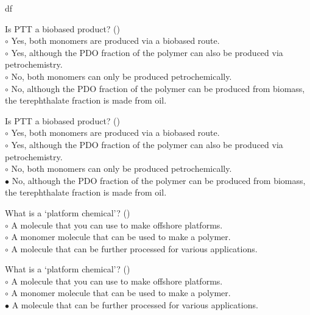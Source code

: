 df\documentclass[]{beamer}
\begin{document}
\begin{CJK}{UTF8}{gbsn}
\begin{frame}[shrink] {}
\addtocounter{questions}{1}
\color{blue}
Is PTT a biobased product?
({})\\
\color{black}
\setlength{\parindent}{-0.4cm}
{\color{red}$\circ$} Yes, both monomers are produced via a biobased route.  \\
{\color{red}$\circ$} Yes, although the PDO fraction of the polymer can also be produced via petrochemistry.   \\
{\color{red}$\circ$} No, both monomers can only be produced petrochemically.   \\
{\color{red}$\circ$}  No, although the PDO fraction of the polymer can be produced from biomass, the terephthalate fraction is made from oil.   \\
\end{frame}
\begin{frame}[shrink] {}
\addtocounter{answers}{1}
\color{blue}
Is PTT a biobased product?
({})\\
\color{black}
\setlength{\parindent}{-0.4cm}
{\color{red}$\circ$} Yes, both monomers are produced via a biobased route.  \\
{\color{red}$\circ$} Yes, although the PDO fraction of the polymer can also be produced via petrochemistry.   \\
{\color{red}$\circ$} No, both monomers can only be produced petrochemically.   \\
{\color{red}$\bullet$} No, although the PDO fraction of the polymer can be produced from biomass, the terephthalate fraction is made from oil.   \\
\end{frame}


\begin{frame}[shrink] {}
\addtocounter{questions}{1}
\color{blue}
What is a ‘platform chemical’?
({})\\
\color{black}
\setlength{\parindent}{-0.4cm}
{\color{red}$\circ$} A molecule that you can use to make offshore platforms.  \\
{\color{red}$\circ$} A monomer molecule that can be used to make a polymer.   \\
{\color{red}$\circ$}  A molecule that can be further processed for various applications.  \\
\end{frame}
\begin{frame}[shrink] {}
\addtocounter{answers}{1}
\color{blue}
What is a ‘platform chemical’?
({})\\
\color{black}
\setlength{\parindent}{-0.4cm}
{\color{red}$\circ$} A molecule that you can use to make offshore platforms.  \\
{\color{red}$\circ$} A monomer molecule that can be used to make a polymer.   \\
{\color{red}$\bullet$} A molecule that can be further processed for various applications.  \\
\end{frame}



\end{CJK}
\end{document}
